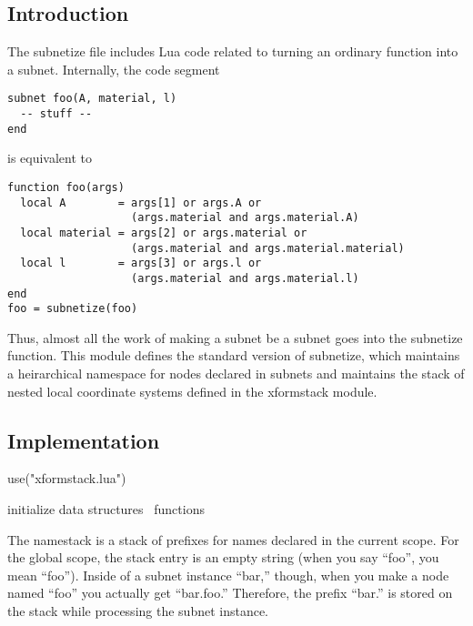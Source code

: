 \subsection{Introduction}%

The {\Tt{}subnetize\nwendquote} file includes Lua code related to turning an ordinary
function into a subnet.  Internally, the code segment
\begin{verbatim}
subnet foo(A, material, l)
  -- stuff --
end
\end{verbatim}
is equivalent to
\begin{verbatim}
function foo(args)
  local A        = args[1] or args.A or 
                   (args.material and args.material.A)
  local material = args[2] or args.material or 
                   (args.material and args.material.material)
  local l        = args[3] or args.l or 
                   (args.material and args.material.l)
end
foo = subnetize(foo)
\end{verbatim}

Thus, almost all the work of making a subnet be a subnet goes
into the {\Tt{}subnetize\nwendquote} function.  This module defines the
standard version of {\Tt{}subnetize\nwendquote}, which maintains a heirarchical
namespace for nodes declared in subnets and maintains the stack
of nested local coordinate systems defined in the {\Tt{}xformstack\nwendquote}
module.


\subsection{Implementation}

\endmoddef\nwstartdeflinemarkup\nwenddeflinemarkup
use("xformstack.lua")

\LA{}initialize data structures~{\nwtagstyle{}}\RA{}
\LA{}functions~{\nwtagstyle{}}\RA{}
\nwendcode{}\nwdocspar

The {\Tt{}namestack\nwendquote} is a stack of prefixes for names declared in the
current scope.  For the global scope, the stack entry is an empty
string (when you say ``foo'', you mean ``foo'').  Inside of a subnet
instance ``bar,'' though, when you make a node named ``foo'' you actually
get ``bar.foo.''  Therefore, the prefix ``bar.'' is stored on the
stack while processing the subnet instance.

